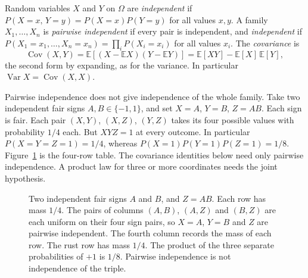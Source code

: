 \begin{definitionx}
Random variables $X$ and $Y$ on $\Omega$ are \emph{independent} if $P(X=x,\,Y=y)=P(X=x)P(Y=y)$ for all values $x,y$. A family $X_1,\ldots,X_n$ is \emph{pairwise independent} if every pair is independent, and \emph{independent} if $P(X_1=x_1,\ldots,X_n=x_n)=\prod_i P(X_i=x_i)$ for all values $x_i$. The \emph{covariance} is
\[
 \operatorname{Cov}(X,Y)=\mathbb E[(X-\mathbb EX)(Y-\mathbb EY)]=\mathbb E[XY]-\mathbb E[X]\,\mathbb E[Y],
\]
the second form by expanding, as for the variance. In particular $\operatorname{Var}X=\operatorname{Cov}(X,X)$.
\end{definitionx}

Pairwise independence does not give independence of the whole family. Take two independent fair signs $A,B\in\{-1,1\}$, and set $X=A$, $Y=B$, $Z=AB$. Each sign is fair. Each pair $(X,Y)$, $(X,Z)$, $(Y,Z)$ takes its four possible values with probability $1/4$ each. But $XYZ=1$ at every outcome. In particular $P(X=Y=Z=1)=1/4$, whereas $P(X=1)P(Y=1)P(Z=1)=1/8$. Figure~\ref{fig:pairsigns} is the four-row table. The covariance identities below need only pairwise independence. A product law for three or more coordinates needs the joint hypothesis.

\begin{figure}[ht]
\centering
{}
\caption{Two independent fair signs $A$ and $B$, and $Z=AB$. Each row has mass $1/4$. The pairs of columns $(A,B)$, $(A,Z)$ and $(B,Z)$ are each uniform on their four sign pairs, so $X=A$, $Y=B$ and $Z$ are pairwise independent. The fourth column records the mass of each row. The rust row has mass $1/4$. The product of the three separate probabilities of $+1$ is $1/8$. Pairwise independence is not independence of the triple.}
\label{fig:pairsigns}
\end{figure}

